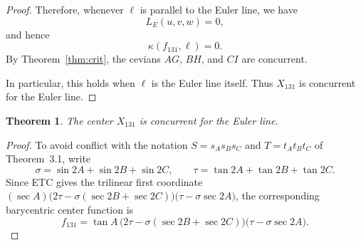 \documentclass[12pt,a4paper]{amsart}
\newtheorem{theorem}{Theorem} [section]
\theoremstyle{remark}
\begin{document}
{\begin{proof}
Therefore, whenever \(\ell\) is parallel to the Euler line, we have
\[
L_E(u,v,w)=0,
\]
and hence
\[
\kappa(f_{131},\ell)=0.
\]
By Theorem~\ref{thm:crit}, the cevians \(AG\), \(BH\), and \(CI\) are concurrent.

In particular, this holds when \(\ell\) is the Euler line itself.  Thus \(X_{131}\)
is concurrent for the Euler line.
\end{proof}


%
%

\begin{theorem}\label{thm:x131euler}
The center $X_{131}$ is concurrent for the Euler line.
\end{theorem}

\begin{proof}
To avoid conflict with the notation $S=s_As_Bs_C$ and $T=t_At_Bt_C$ of
Theorem~3.1, write
\[
\sigma=\sin 2A+\sin 2B+\sin 2C,
\qquad
\tau=\tan 2A+\tan 2B+\tan 2C.
\]
Since ETC gives the trilinear first coordinate
$(\sec A)\bigl(2\tau-\sigma(\sec 2B+\sec 2C)\bigr)\bigl(\tau-\sigma\sec 2A\bigr)$,
the corresponding barycentric center function is
\begin{equation}\label{eq:f131etc}
f_{131}
=\tan A\,\bigl(2\tau-\sigma(\sec 2B+\sec 2C)\bigr)\bigl(\tau-\sigma\sec 2A\bigr).
\end{equation}


\end{proof}}
\end{document}
